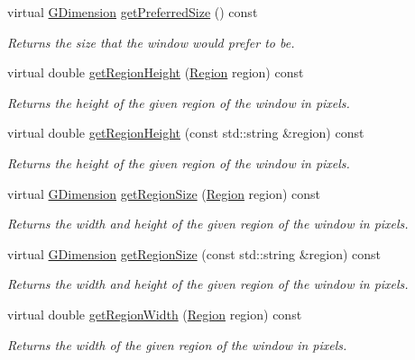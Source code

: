 \begin{DoxyCompactItemize}
virtual \mbox{\hyperlink{structGDimension}{G\+Dimension}} \mbox{\hyperlink{classGWindow_a4aabbee761d8e9116275401131b7ccd1}{get\+Preferred\+Size}} () const
\begin{DoxyCompactList}\small\item\em Returns the size that the window would prefer to be. \end{DoxyCompactList}\item 
virtual double \mbox{\hyperlink{classGWindow_a164d248057318961e7f2abc8c3477d63}{get\+Region\+Height}} (\mbox{\hyperlink{classGWindow_a81a01a86de31071a92e6cce0bab9bc4b}{Region}} region) const
\begin{DoxyCompactList}\small\item\em Returns the height of the given region of the window in pixels. \end{DoxyCompactList}\item 
virtual double \mbox{\hyperlink{classGWindow_ae8a545e772745b89edaf9804a2dc0057}{get\+Region\+Height}} (const std\+::string \&region) const
\begin{DoxyCompactList}\small\item\em Returns the height of the given region of the window in pixels. \end{DoxyCompactList}\item 
virtual \mbox{\hyperlink{structGDimension}{G\+Dimension}} \mbox{\hyperlink{classGWindow_a3b5db9ffbd4b32260f80634f162dba4e}{get\+Region\+Size}} (\mbox{\hyperlink{classGWindow_a81a01a86de31071a92e6cce0bab9bc4b}{Region}} region) const
\begin{DoxyCompactList}\small\item\em Returns the width and height of the given region of the window in pixels. \end{DoxyCompactList}\item 
virtual \mbox{\hyperlink{structGDimension}{G\+Dimension}} \mbox{\hyperlink{classGWindow_a68b18b38b72cb8779fca0c3882549a6b}{get\+Region\+Size}} (const std\+::string \&region) const
\begin{DoxyCompactList}\small\item\em Returns the width and height of the given region of the window in pixels. \end{DoxyCompactList}\item 
virtual double \mbox{\hyperlink{classGWindow_a96e2005c3f447a8679c3c32d3fc02de1}{get\+Region\+Width}} (\mbox{\hyperlink{classGWindow_a81a01a86de31071a92e6cce0bab9bc4b}{Region}} region) const
\begin{DoxyCompactList}\small\item\em Returns the width of the given region of the window in pixels. \end{DoxyCompactList}\item 

\end{DoxyCompactItemize}
